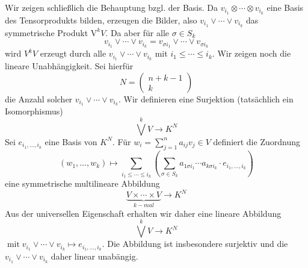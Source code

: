 Wir zeigen schließlich die Behauptung bzgl. der Basis. Da $v_{i_{1}} \otimes \cdots \otimes v_{i_{k}}$ eine Basis des Tensorprodukts bilden, erzeugen die Bilder, also $v_{i_{1}} \vee \cdots \vee v_{i_{k}}$ das symmetrische Produkt $\mathrm{V}^{k} V .$ Da aber für alle $\sigma \in S_{k}$
$$
v_{i_{1}} \vee \cdots \vee v_{i_{k}}=v_{\sigma i_{1}} \vee \cdots \vee v_{\sigma i_{k}}
$$
wird $V^{k} V$ erzeugt durch alle $v_{i_{1}} \vee \cdots \vee v_{i_{k}}$ mit $i_{1} \leqslant \cdots \leqslant i_{k} .$ Wir zeigen noch die lineare Unabhängigkeit. Sei hierfür
$$
N=\left(\begin{array}{c}
n+k-1 \\
k
\end{array}\right)
$$
die Anzahl solcher $v_{i_{1}} \vee \cdots \vee v_{i_{k}} .$ Wir definieren eine Surjektion (tatsächlich ein Isomorphismus)
$$
\bigvee^{k} V \rightarrow K^{N}
$$
Sei $e_{i_{1}, \ldots, i_{k}}$ eine Basis von $K^{N} .$ Für $w_{i}=\sum_{j=1}^{n} a_{i j} v_{j} \in V$ definiert die Zuordnung
$$
\left(w_{1}, \ldots, w_{k}\right) \mapsto \sum_{i_{1} \leqslant \cdots \leqslant i_{k}}\left(\sum_{\sigma \in S_{k}} a_{1 \sigma i_{1}} \cdots a_{k \sigma i_{k}} \cdot e_{i_{1}, \ldots, i_{k}}\right)
$$
eine symmetrische multilineare Abbildung
$$
\underbrace{V \times \cdots \times V}_{k-m a l} \rightarrow K^{N}
$$
Aus der universellen Eigenschaft erhalten wir daher eine lineare Abbildung
$$
\bigvee^{k} V \rightarrow K^{N}
$$
$\operatorname{mit} v_{i_{1}} \vee \cdots \vee v_{i_{k}} \mapsto e_{i_{1}, \ldots, i_{k}} .$ Die Abbildung ist insbesondere surjektiv und die
$v_{i_{1}} \vee \cdots \vee v_{i_{k}}$ daher linear unabängig.

